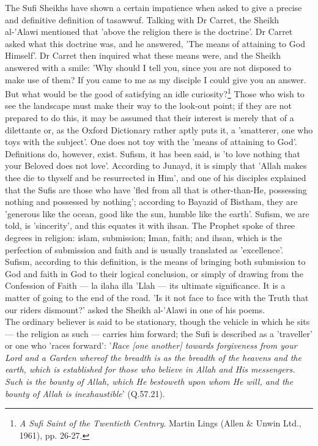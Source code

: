 \documentclass[11pt, b5paper, twoside]{book}
\begin{document}
The Sufi Sheikhs have shown a certain impatience when asked to give a precise and definitive 
definition of tasawwuf. Talking with Dr Carret, the Sheikh al-'Alawi mentioned that 'above the 
religion there is the doctrine'. Dr Carret asked what this doctrine was, and he answered, 'The means 
of attaining to God Himself'. Dr Carret then inquired what these means were, and the Sheikh answered 
with a smile: 'Why should I tell you, since you are not disposed to make use of them? If you came to 
me as my disciple I could give you an answer. But what would be the good of satisfying an idle 
curiosity?\footnote{\emph{A Sufi Saint of the Twentieth Centnry}. Martin Lings (Allen \& Unwin Ltd., 1961), pp. 26-27.} Those who wish to see the landscape must make their way to the look-out point; if they 
are not prepared to do this, it may be assumed that their interest is merely that of a dilettante or, 
as the Oxford Dictionary rather aptly puts it, a 'smatterer, one who toys with the subject'. One does 
not toy with the 'means of attaining to God'. \\

Definitions do, however, exist. Sufism, it has been said, is 'to love nothing that your Beloved does 
not love'. According to Junayd, it is simply that 'Allah makes thee die to thyself and be resurrected 
in Him', and one of his disciples explained that the Sufis are those who have 'fled from all that is 
other-than-He, possessing nothing and possessed by nothing'; according to Bayazid of Bistham, they 
are 'generous like the ocean, good like the sun, humble like the earth'. Sufism, we are told, is 
'sincerity', and this equates it with ihsan. The Prophet spoke of three degrees in religion: islam, 
submission; Iman, faith; and ihsan, which is the perfection of submission and faith and is usually 
translated as 'excellence'. Sufism, according to this definition, is the means of bringing both 
submission to God and faith in God to their logical conclusion, or simply of drawing from the 
Confession of Faith --- la ilaha illa 'Llah --- its ultimate significance. It is a matter of going to the 
end of the road. 'Is it not face to face with the Truth that our riders dismount?' asked the Sheikh 
al-'Alawi in one of his poems. \\

The ordinary believer is said to be stationary, though the vehicle in which he sits --- the religion as 
such --- carries him forward; the Sufi is described as a 'traveller' or one who 'races forward': '\emph{Race 
[one another] towards forgiveness from your Lord and a Garden whereof the breadth is as the breadth 
of the heavens and the earth, which is established for those who believe in Allah and His messengers. 
Such is the bounty of Allah, which He bestoweth upon whom He will, and the bounty of Allah is 
inexhaustible}' (Q.57.21). \\
\end{document}
